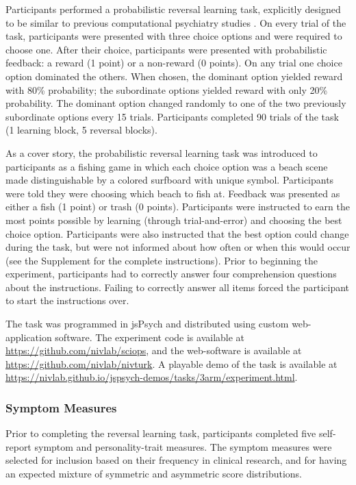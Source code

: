 \documentclass[a4paper,notitlepage,12pt]{article}
\begin{document}
\begin{refsection}[main]
Participants performed a probabilistic reversal learning task, explicitly designed to be similar to previous computational psychiatry studies \cite{waltz2007probabilistic, mukherjee_reward_2020}. On every trial of the task, participants were presented with three choice options and were required to choose one. After their choice, participants were presented with probabilistic feedback: a reward (1 point) or a non-reward (0 points). On any trial one choice option dominated the others. When chosen, the dominant option yielded reward with 80\% probability; the subordinate options yielded reward with only 20\% probability. The dominant option changed randomly to one of the two previously subordinate options every 15 trials. Participants completed 90 trials of the task (1 learning block, 5 reversal blocks). 

As a cover story, the probabilistic reversal learning task was introduced to participants as a fishing game in which each choice option was a beach scene made distinguishable by a colored surfboard with unique symbol. Participants were told they were choosing which beach to fish at. Feedback was presented as either a fish (1 point) or trash (0 points). Participants were instructed to earn the most points possible by learning (through trial-and-error) and choosing the best choice option. Participants were also instructed that the best option could change during the task, but were not informed about how often or when this would occur (see the Supplement for the complete instructions). Prior to beginning the experiment, participants had to correctly answer four comprehension questions about the instructions. Failing to correctly answer all items forced the participant to start the instructions over.

The task was programmed in jsPsych \cite{deleeuw_2015_jspsych} and distributed using custom web-application software. The experiment code is available at \url{https://github.com/nivlab/sciops}, and the web-software is available at \url{https://github.com/nivlab/nivturk}. A playable demo of the task is available at \url{https://nivlab.github.io/jspsych-demos/tasks/3arm/experiment.html}.

\subsubsection{Symptom Measures}

Prior to completing the reversal learning task, participants completed five self-report symptom and personality-trait measures. The symptom measures were selected for inclusion based on their frequency in clinical research, and for having an expected mixture of symmetric and asymmetric score distributions. 


\end{refsection}
\end{document}
